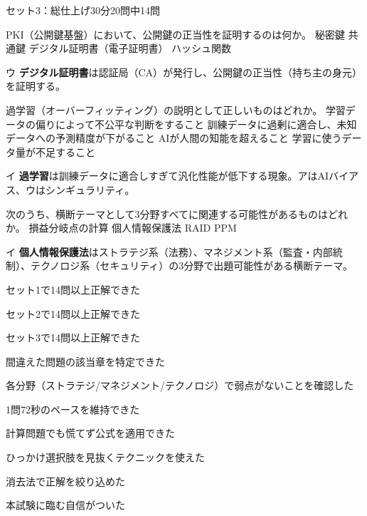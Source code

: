 \begin{mogishi}{セット3：総仕上げ}{30分}{20問中14問}
\begin{itpmon}[\diffbadge{標}]{PKI（公開鍵基盤）において、公開鍵の正当性を証明するのは何か。}
\sentakushi
  {秘密鍵}
  {共通鍵}
  {デジタル証明書（電子証明書）}
  {ハッシュ関数}
\end{itpmon}
\begin{kaisetsu}{ウ}
\textbf{デジタル証明書}は認証局（CA）が発行し、公開鍵の正当性（持ち主の身元）を証明する。
\end{kaisetsu}

\begin{itpmon}[\diffbadge{標}]{過学習（オーバーフィッティング）の説明として正しいものはどれか。}
\sentakushi
  {学習データの偏りによって不公平な判断をすること}
  {訓練データに過剰に適合し、未知データへの予測精度が下がること}
  {AIが人間の知能を超えること}
  {学習に使うデータ量が不足すること}
\end{itpmon}
\begin{kaisetsu}{イ}
\textbf{過学習}は訓練データに適合しすぎて汎化性能が低下する現象。アはAIバイアス、ウはシンギュラリティ。
\end{kaisetsu}

\begin{itpmon}[\diffbadge{強}]{次のうち、横断テーマとして3分野すべてに関連する可能性があるものはどれか。}
\sentakushi
  {損益分岐点の計算}
  {個人情報保護法}
  {RAID}
  {PPM}
\end{itpmon}
\begin{kaisetsu}{イ}
\textbf{個人情報保護法}はストラテジ系（法務）、マネジメント系（監査・内部統制）、テクノロジ系（セキュリティ）の3分野で出題可能性がある横断テーマ。
\end{kaisetsu}

\end{mogishi}


\begin{tatsaku}[模擬試験の振り返りチェック]
  \item セット1で14問以上正解できた
  \item セット2で14問以上正解できた
  \item セット3で14問以上正解できた
  \item 間違えた問題の該当章を特定できた
  \item 各分野（ストラテジ/マネジメント/テクノロジ）で弱点がないことを確認した
  \item 1問72秒のペースを維持できた
  \item 計算問題でも慌てず公式を適用できた
  \item ひっかけ選択肢を見抜くテクニックを使えた
  \item 消去法で正解を絞り込めた
  \item 本試験に臨む自信がついた
\end{tatsaku}
